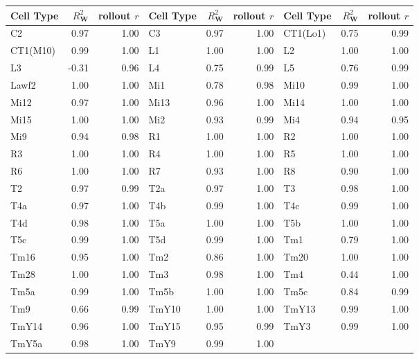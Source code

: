 \begin{tabular}{lrr@{\quad}lrr@{\quad}lrr}
\toprule
Cell Type & $R^2_{\mathbf{W}}$ & rollout $r$ &Cell Type & $R^2_{\mathbf{W}}$ & rollout $r$ & Cell Type & $R^2_{\mathbf{W}}$ & rollout $r$ \\
\midrule
C2         & 0.97 & 1.00 & C3         & 0.97 & 1.00 & CT1(Lo1)   & 0.75 & 0.99 \\
CT1(M10)   & 0.99 & 1.00 & L1         & 1.00 & 1.00 & L2         & 1.00 & 1.00 \\
L3         & -0.31 & 0.96 & L4         & 0.75 & 0.99 & L5         & 0.76 & 0.99 \\
Lawf2      & 1.00 & 1.00 & Mi1        & 0.78 & 0.98 & Mi10       & 0.99 & 1.00 \\
Mi12       & 0.97 & 1.00 & Mi13       & 0.96 & 1.00 & Mi14       & 1.00 & 1.00 \\
Mi15       & 1.00 & 1.00 & Mi2        & 0.93 & 0.99 & Mi4        & 0.94 & 0.95 \\
Mi9        & 0.94 & 0.98 & R1         & 1.00 & 1.00 & R2         & 1.00 & 1.00 \\
R3         & 1.00 & 1.00 & R4         & 1.00 & 1.00 & R5         & 1.00 & 1.00 \\
R6         & 1.00 & 1.00 & R7         & 0.93 & 1.00 & R8         & 0.90 & 1.00 \\
T2         & 0.97 & 0.99 & T2a        & 0.97 & 1.00 & T3         & 0.98 & 1.00 \\
T4a        & 0.97 & 1.00 & T4b        & 0.99 & 1.00 & T4c        & 0.99 & 1.00 \\
T4d        & 0.98 & 1.00 & T5a        & 1.00 & 1.00 & T5b        & 1.00 & 1.00 \\
T5c        & 0.99 & 1.00 & T5d        & 0.99 & 1.00 & Tm1        & 0.79 & 1.00 \\
Tm16       & 0.95 & 1.00 & Tm2        & 0.86 & 1.00 & Tm20       & 1.00 & 1.00 \\
Tm28       & 1.00 & 1.00 & Tm3        & 0.98 & 1.00 & Tm4        & 0.44 & 1.00 \\
Tm5a       & 0.99 & 1.00 & Tm5b       & 1.00 & 1.00 & Tm5c       & 0.84 & 0.99 \\
Tm9        & 0.66 & 0.99 & TmY10      & 1.00 & 1.00 & TmY13      & 0.99 & 1.00 \\
TmY14      & 0.96 & 1.00 & TmY15      & 0.95 & 0.99 & TmY3       & 0.99 & 1.00 \\
TmY5a      & 0.98 & 1.00 & TmY9       & 0.99 & 1.00 &  & &  \\
\bottomrule
\end{tabular}
